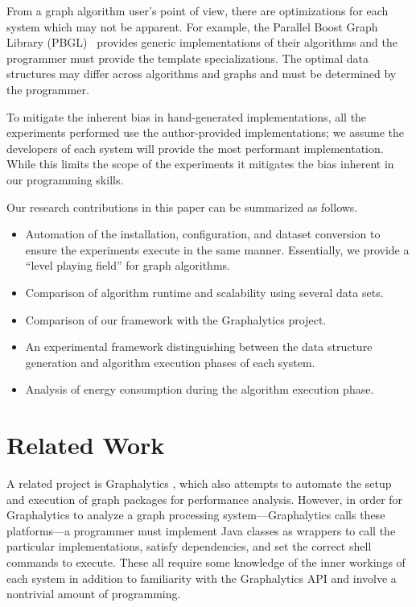 \documentclass{llncs}
\begin{document}
From a graph algorithm user's point of view, there are optimizations for each system which may not be apparent. For example, the Parallel Boost Graph Library (PBGL)~\cite{Gregor:2005:PBGL} provides generic implementations of their algorithms and the programmer must provide the template specializations. The optimal data structures may differ across algorithms and graphs and must be determined by the programmer.

To mitigate the inherent bias in hand-generated implementations, all the experiments performed use the author-provided implementations; we assume the developers of each system will provide the most performant implementation. While this limits the scope of the experiments it mitigates the bias inherent in our programming skills.


Our research contributions in this paper can be summarized as follows.
\begin{itemize}
	\item Automation of the installation, configuration, and dataset conversion to ensure the experiments execute in the same manner. Essentially, we provide a ``level playing field'' for graph algorithms.
	\item Comparison of algorithm runtime and scalability using several data sets.
	\item Comparison of our framework with the Graphalytics \cite{Capota:2015:Graphalytics} project.
	\item An experimental framework distinguishing between the data structure generation and algorithm execution phases of each system.
	\item Analysis of energy consumption during the algorithm execution phase.
\end{itemize}

\section{Related Work}
A related project is Graphalytics \cite{Capota:2015:Graphalytics}, which also attempts to automate the setup and execution of graph packages for performance analysis. However, in order for Graphalytics to analyze a graph processing system---Graphalytics calls these platforms---a programmer must implement Java classes as wrappers to call the particular implementations, satisfy dependencies, and set the correct shell commands to execute. These all require some knowledge of the inner workings of each system in addition to familiarity with the Graphalytics API and involve a nontrivial amount of programming.
\end{document}
